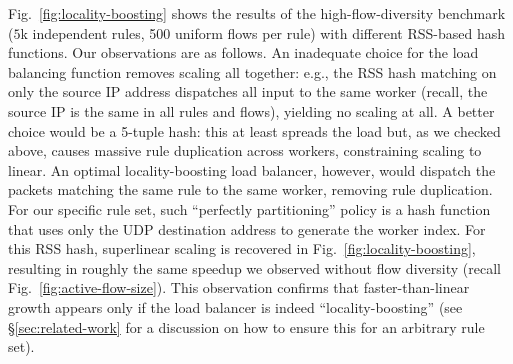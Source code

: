 Fig.~\ref{fig:locality-boosting} shows the results of the high-flow-diversity benchmark ($5$k independent rules, 500 uniform flows per rule) with different RSS-based hash functions. Our observations are as follows. An inadequate choice for the load balancing function removes scaling all together: e.g., the RSS hash matching on only the source IP address dispatches all input to the same worker (recall, the source IP is the same in all rules and flows), yielding no scaling at all. A better choice would be a 5-tuple hash: this at least spreads the load but, as we checked above, causes massive rule duplication across workers, constraining scaling to linear.  An optimal locality-boosting load balancer, however, would dispatch the packets matching the same rule to the same worker, removing rule duplication. For our specific rule set, such ``perfectly partitioning'' policy is a hash function that uses only the UDP destination address to generate the worker index. For this RSS hash, superlinear scaling is recovered in Fig.~\ref{fig:locality-boosting}, resulting in roughly the same speedup we observed without flow diversity (recall Fig.~\ref{fig:active-flow-size}).  This observation confirms that faster-than-linear growth appears only if the load balancer is indeed ``locality-boosting'' (see \S\ref{sec:related-work} for a discussion on how to ensure this for an arbitrary rule set).

